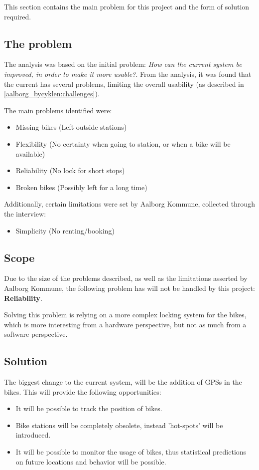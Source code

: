 This section contains the main problem for this project and the form of solution required.

\subsection{The problem}
The analysis was based on the initial problem: \textit{How can the current \citybike system be improved, in order to make it more usable?}.
From the analysis, it was found that the current \citybike has several problems, limiting the overall usability (as described in \cref{aalborg_bycyklen:challenges}).

The main problems identified were:
\begin{itemize}
\item Missing bikes (Left outside stations)
\item Flexibility (No certainty when going to station, or when a bike will be available)
\item Reliability (No lock for short stops)
\item Broken bikes (Possibly left for a long time)
\end{itemize}

Additionally, certain limitations were set by Aalborg Kommune, collected through the interview:

\begin{itemize}
\item Simplicity (No renting/booking)
\end{itemize}

\subsection{Scope}
Due to the size of the problems described, as well as the limitations asserted by Aalborg Kommune, the following problem has will not be handled by this project: \textbf{Reliability}.

Solving this problem is relying on a more complex locking system for the bikes, which is more interesting from a hardware perspective, but not as much from a software perspective.

\subsection{Solution}
The biggest change to the current system, will be the addition of GPSs in the bikes.
This will provide the following opportunities:
\begin{itemize}
\item It will be possible to track the position of bikes.
\item Bike stations will be completely obsolete, instead 'hot-spots' will be introduced.
\item It will be possible to monitor the usage of bikes, thus statistical predictions on future locations and behavior will be possible.
\end{itemize}

